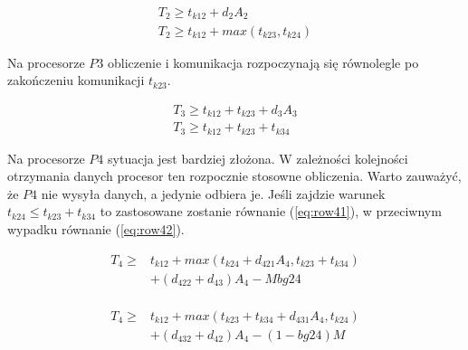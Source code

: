 \begin{equation}
\begin{array}{l}
T_{2} \geq t_{k12} + d_{2}A_{2} \\
T_{2} \geq t_{k12} + max(t_{k23}, t_{k24})
\end{array}
\end{equation}

Na procesorze $P3$ obliczenie i komunikacja rozpoczynają się równolegle po zakończeniu komunikacji $t_{k23}$.

\begin{equation}
\begin{array}{l}
T_{3} \geq t_{k12} + t_{k23} + d_{3}A_{3} \\
T_{3} \geq t_{k12} + t_{k23} + t_{k34}
\end{array}
\end{equation}

Na procesorze $P4$ sytuacja jest bardziej złożona. W zależności kolejności otrzymania danych procesor ten rozpocznie stosowne obliczenia.
Warto zauważyć, że $P4$ nie wysyła danych, a jedynie odbiera je.
Jeśli zajdzie warunek $t_{k24} \leq t_{k23} + t_{k34}$ to zastosowane zostanie równanie (\ref{eq:row41}), w przeciwnym wypadku równanie (\ref{eq:row42}).

\begin{equation} \label{eq:row41}
\begin{array}{rl}
T_{4} \geq &t_{k12} + max(t_{k24} + d_{421}A_{4}, t_{k23} + t_{k34}) \\
&+ (d_{422} + d_{43})A_{4} - Mbg24 \\
\end{array}
\end{equation}

\begin{equation} \label{eq:row42}
\begin{array}{rl}
T_{4} \geq &t_{k12} + max(t_{k23} + t_{k34} + d_{431}A_{4}, t_{k24}) \\
&+ (d_{432} + d_{42})A_{4} - (1-bg24)M
\end{array}
\end{equation}

\newpage
